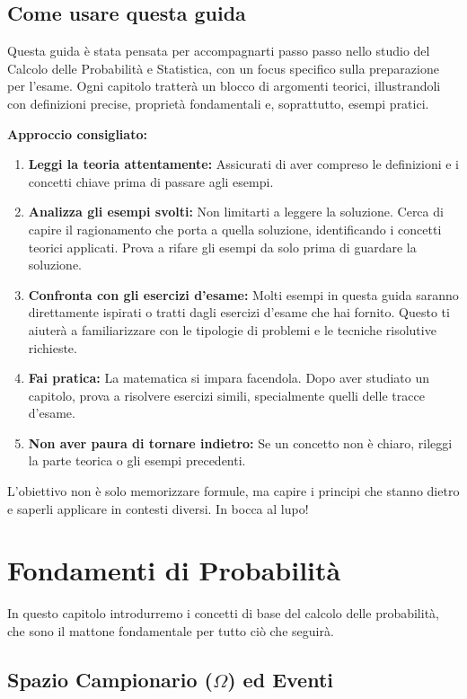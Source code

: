 \documentclass[12pt,a4paper]{article}
\begin{document}
\section{Come usare questa guida}
Questa guida è stata pensata per accompagnarti passo passo nello studio del Calcolo delle Probabilità e Statistica, con un focus specifico sulla preparazione per l'esame. Ogni capitolo tratterà un blocco di argomenti teorici, illustrandoli con definizioni precise, proprietà fondamentali e, soprattutto, esempi pratici.

\textbf{Approccio consigliato:}
\begin{enumerate}
    \item \textbf{Leggi la teoria attentamente:} Assicurati di aver compreso le definizioni e i concetti chiave prima di passare agli esempi.
    \item \textbf{Analizza gli esempi svolti:} Non limitarti a leggere la soluzione. Cerca di capire il ragionamento che porta a quella soluzione, identificando i concetti teorici applicati. Prova a rifare gli esempi da solo prima di guardare la soluzione.
    \item \textbf{Confronta con gli esercizi d'esame:} Molti esempi in questa guida saranno direttamente ispirati o tratti dagli esercizi d'esame che hai fornito. Questo ti aiuterà a familiarizzare con le tipologie di problemi e le tecniche risolutive richieste.
    \item \textbf{Fai pratica:} La matematica si impara facendola. Dopo aver studiato un capitolo, prova a risolvere esercizi simili, specialmente quelli delle tracce d'esame.
    \item \textbf{Non aver paura di tornare indietro:} Se un concetto non è chiaro, rileggi la parte teorica o gli esempi precedenti.
\end{enumerate}
L'obiettivo non è solo memorizzare formule, ma capire i principi che stanno dietro e saperli applicare in contesti diversi. In bocca al lupo!

\chapter{Fondamenti di Probabilità}
\label{cap:fondamenti}
In questo capitolo introdurremo i concetti di base del calcolo delle probabilità, che sono il mattone fondamentale per tutto ciò che seguirà.

\section{Spazio Campionario (\texorpdfstring{$\Omega$}{Omega}) ed Eventi}
\end{document}
